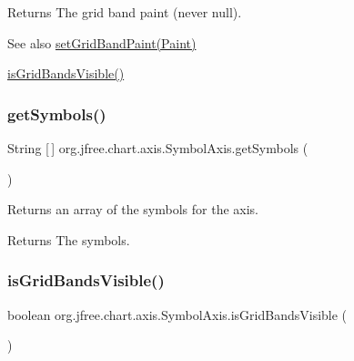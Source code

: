 \begin{DoxyReturn}{Returns}
The grid band paint (never {\ttfamily null}).
\end{DoxyReturn}
\begin{DoxySeeAlso}{See also}
\mbox{\hyperlink{classorg_1_1jfree_1_1chart_1_1axis_1_1_symbol_axis_af856b13e59d84b2df9ff838b0363a6d3}{set\+Grid\+Band\+Paint(\+Paint)}} 

\mbox{\hyperlink{classorg_1_1jfree_1_1chart_1_1axis_1_1_symbol_axis_a0201bb1eb987ff0fccdb1ed6401f6546}{is\+Grid\+Bands\+Visible()}} 
\end{DoxySeeAlso}
\mbox{\label{classorg_1_1jfree_1_1chart_1_1axis_1_1_symbol_axis_a752482c415cc78ad2d0296a32d57f9e4}} 
\subsubsection{\texorpdfstring{get\+Symbols()}{getSymbols()}}
{\footnotesize\ttfamily String \mbox{[}$\,$\mbox{]} org.\+jfree.\+chart.\+axis.\+Symbol\+Axis.\+get\+Symbols (\begin{DoxyParamCaption}{ }\end{DoxyParamCaption})}

Returns an array of the symbols for the axis.

\begin{DoxyReturn}{Returns}
The symbols. 
\end{DoxyReturn}
\mbox{\label{classorg_1_1jfree_1_1chart_1_1axis_1_1_symbol_axis_a0201bb1eb987ff0fccdb1ed6401f6546}} 
\subsubsection{\texorpdfstring{is\+Grid\+Bands\+Visible()}{isGridBandsVisible()}}
{\footnotesize\ttfamily boolean org.\+jfree.\+chart.\+axis.\+Symbol\+Axis.\+is\+Grid\+Bands\+Visible (\begin{DoxyParamCaption}{ }\end{DoxyParamCaption})}

